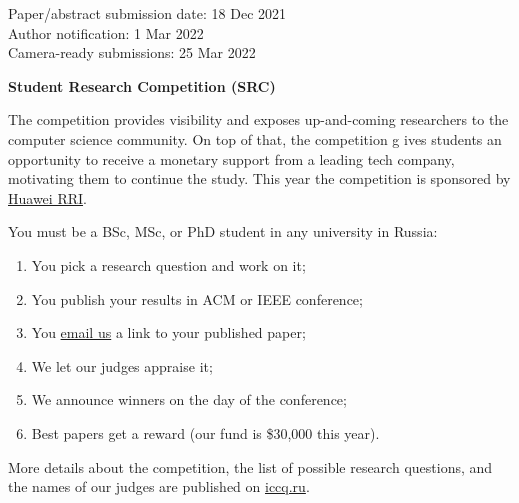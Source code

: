 \documentclass{../cfp}
\begin{document}
\vspace{6pt}

Paper/abstract submission date: 18 Dec 2021 \\
Author notification: 1 Mar 2022 \\
Camera-ready submissions: 25 Mar 2022


\newpage

{\color{xred}\bfseries{\Large Student Research Competition (SRC)}}

The competition provides visibility and exposes up-and-coming
researchers to the computer science community. On top of that, the competition g
ives students an opportunity to receive a monetary support from a leading tech
company, motivating them to continue the study.
This year the competition is sponsored by \href{https://career.huawei.ru/rri/}{Huawei RRI}.

You must be a BSc, MSc, or PhD student in any university in Russia:

\begin{enumerate}
\item You pick a research question and work on it;
\item You publish your results in ACM or IEEE conference;
\item You \href{mailto:src@iccq.ru}{email us} a link to your published paper;
\item We let our judges appraise it;
\item We announce winners on the day of the conference;
\item Best papers get a reward (our fund is \$30,000 this year).
\end{enumerate}

More details about the competition, the list of possible research questions,
and the names of our judges are published on \href{https://www.iccq.ru}{iccq.ru}.
\end{document}
